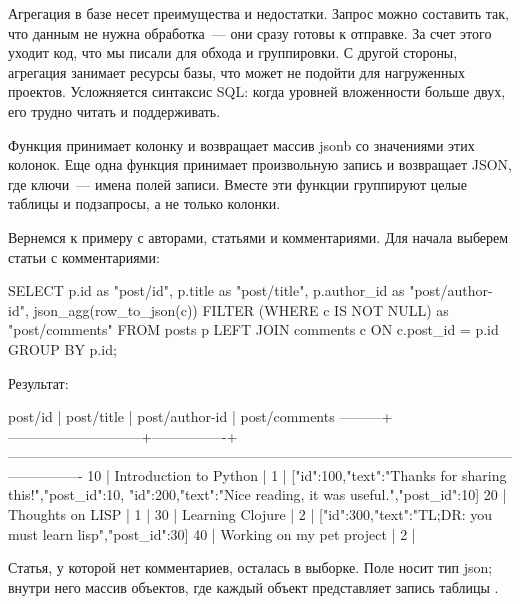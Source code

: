 Агрегация в базе несет преимущества и недостатки. Запрос можно составить так, что данным не нужна обработка~--- они сразу готовы к отправке. За счет этого уходит код, что мы писали для обхода и группировки. С другой стороны, агрегация занимает ресурсы базы, что может не подойти для нагруженных проектов. Усложняется синтаксис SQL: когда уровней вложенности больше двух, его трудно читать и поддерживать.

Функция  принимает колонку и возвращает массив jsonb со значениями этих колонок. Еще одна функция  принимает произвольную запись и возвращает JSON, где ключи~--- имена полей записи. Вместе эти функции группируют целые таблицы и подзапросы, а не только колонки.

Вернемся к примеру с авторами, статьями и комментариями. Для начала выберем статьи с комментариями:


\begin{english}
  \begin{sql}
SELECT
  p.id        as "post/id",
  p.title     as "post/title",
  p.author_id as "post/author-id",
  json_agg(row_to_json(c)) FILTER (WHERE c IS NOT NULL) as "post/comments"
FROM posts p
LEFT JOIN comments c ON c.post_id = p.id
GROUP BY p.id;
  \end{sql}
\end{english}

Результат:

\begin{english}
  \begin{text}
 post/id |         post/title          | post/author-id |                                                       post/comments
---------+-----------------------------+----------------+----------------------------------------------------------------------------------------------------------------------------
      10 | Introduction to Python      |              1 | [{"id":100,"text":"Thanks for sharing this!","post_id":10}, {"id":200,"text":"Nice reading, it was useful.","post_id":10}]
      20 | Thoughts on LISP            |              1 |
      30 | Learning Clojure            |              2 | [{"id":300,"text":"TL;DR: you must learn lisp","post_id":30}]
      40 | Working on my pet project   |              2 |
  \end{text}
\end{english}

Статья, у которой нет комментариев, осталась в выборке. Поле  носит тип json; внутри него массив объектов, где каждый объект представляет запись таблицы .

